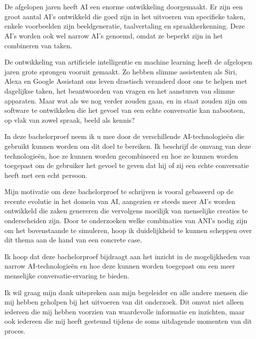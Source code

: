 
\chapter*{}
\label{ch:voorwoord}


De afgelopen jaren heeft AI een enorme ontwikkeling doorgemaakt. Er zijn een groot aantal AI's ontwikkeld die goed zijn in het uitvoeren van specifieke taken, enkele voorbeelden zijn beeldgeneratie, taalvertaling en spraakherkenning. Deze AI's worden ook wel narrow AI's genoemd, omdat ze beperkt zijn in het combineren van taken.

De ontwikkeling van artificiele intelligentie en machine learning heeft de afgelopen jaren grote sprongen vooruit gemaakt. Zo hebben slimme assistenten als Siri, Alexa en Google Assistant ons leven drastisch veranderd door ons te helpen met dagelijkse taken, het beantwoorden van vragen en het aansturen van slimme apparaten. Maar wat als we nog verder zouden gaan, en in staat zouden zijn om software te ontwikkelen die het gevoel van een echte conversatie kan nabootsen, op vlak van zowel spraak, beeld als kennis?

In deze bachelorproef neem ik u mee door de verschillende AI-technologieën die gebruikt kunnen worden om dit doel te bereiken. Ik beschrijf de omvang van deze technologieën, hoe ze kunnen worden gecombineerd en hoe ze kunnen worden toegepast om de gebruiker het gevoel te geven dat hij of zij een echte conversatie heeft met een echt persoon.

Mijn motivatie om deze bachelorproef te schrijven is vooral gebaseerd op de recente evolutie in het domein van AI, aangezien er steeds meer AI's worden ontwikkeld die zaken genereren die vervolgens moeilijk van menselijke creaties te onderscheiden zijn. Door te onderzoeken welke combinaties van ANI's nodig zijn om het bovenstaande te simuleren, hoop ik duidelijkheid te kunnen scheppen over dit thema aan de hand van een concrete case.

\newpage

Ik hoop dat deze bachelorproef bijdraagt aan het inzicht in de mogelijkheden van narrow AI-technologieën en hoe deze kunnen worden toegepast om een meer menselijke conversatie-ervaring te bieden.

Ik wil graag mijn dank uitspreken aan mijn begeleider en alle andere mensen die mij hebben geholpen bij het uitvoeren van dit onderzoek. Dit omvat niet alleen iedereen die mij hebben voorzien van waardevolle informatie en inzichten, maar ook iedereen die mij heeft gesteund tijdens de soms uitdagende momenten van dit proces.

